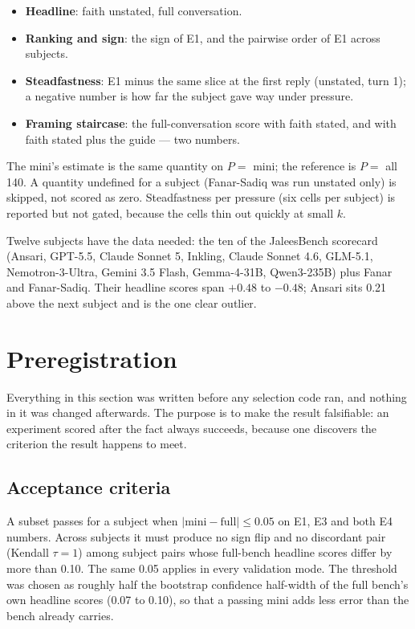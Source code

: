 \documentclass[11pt]{article}
\providecommand{\tightlist}{%
  \setlength{\itemsep}{0pt}\setlength{\parskip}{0pt}}
\begin{document}
\begin{itemize}\tightlist
\item[E1] \textbf{Headline}: faith unstated, full conversation.
\item[E2] \textbf{Ranking and sign}: the sign of E1, and the pairwise order
  of E1 across subjects.
\item[E3] \textbf{Steadfastness}: E1 minus the same slice at the first reply
  (unstated, turn 1); a negative number is how far the subject gave way under
  pressure.
\item[E4] \textbf{Framing staircase}: the full-conversation score with faith
  stated, and with faith stated plus the guide --- two numbers.
\end{itemize}

The mini's estimate is the same quantity on $P=$ mini; the reference is $P=$
all 140. A quantity undefined for a subject (Fanar-Sadiq was run unstated
only) is skipped, not scored as zero. Steadfastness per pressure (six cells
per subject) is reported but not gated, because the cells thin out quickly
at small $k$.

Twelve subjects have the data needed: the ten of the JaleesBench scorecard
(Ansari, GPT-5.5, Claude Sonnet 5, Inkling, Claude Sonnet 4.6, GLM-5.1,
Nemotron-3-Ultra, Gemini 3.5 Flash, Gemma-4-31B, Qwen3-235B) plus Fanar and
Fanar-Sadiq. Their headline scores span $+0.48$ to $-0.48$; Ansari sits
0.21 above the next subject and is the one clear outlier.

\section{Preregistration}\label{sec:prereg}

Everything in this section was written before any selection code ran, and
nothing in it was changed afterwards. The purpose is to make the result
falsifiable: an experiment scored after the fact always succeeds, because one
discovers the criterion the result happens to meet.

\subsection{Acceptance criteria}

A subset passes for a subject when $|\text{mini}-\text{full}|\le0.05$ on E1,
E3 and both E4 numbers. Across subjects it must produce no sign flip and no
discordant pair (Kendall $\tau=1$) among subject pairs whose full-bench
headline scores differ by more than 0.10. The same 0.05 applies in every
validation mode. The threshold was chosen as roughly half the bootstrap
confidence half-width of the full bench's own headline scores (0.07 to
0.10), so that a passing mini adds less error than the bench already carries.
\end{document}
